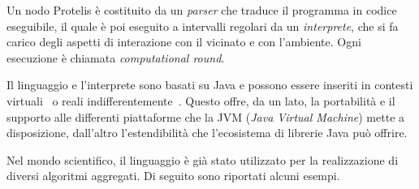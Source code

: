 %   

Un nodo Protelis è costituito da un \emph{parser} che traduce il programma in codice eseguibile, il quale è poi eseguito a intervalli regolari da un \emph{interprete}, che si fa carico degli aspetti di interazione con il vicinato e con l'ambiente.
Ogni esecuzione è chiamata \emph{computational round}.

Il linguaggio e l'interprete sono basati su Java e possono essere inseriti in contesti virtuali~\cite{ProtelisSAC14} o reali indifferentemente~\cite{AggregatecomputingVlsubicomp16}.
Questo offre, da un lato, la portabilità e il supporto alle differenti piattaforme che la JVM (\emph{Java Virtual Machine}) mette a disposizione, dall'altro l'estendibilità che l'ecosistema di librerie Java può offrire.

Nel mondo scientifico, il linguaggio è già stato utilizzato per la realizzazione di diversi algoritmi aggregati.
Di seguito sono riportati alcuni esempi.

